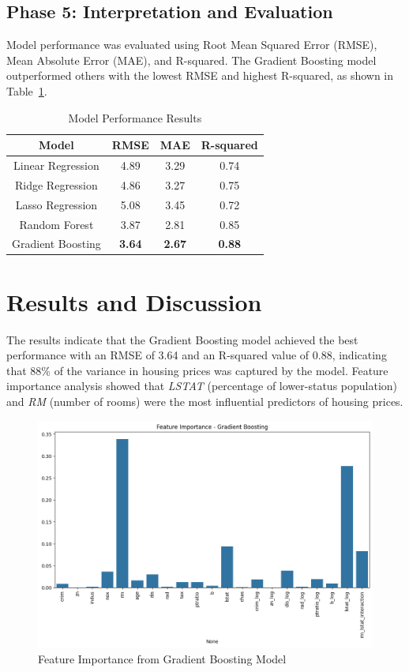 \documentclass[12pt]{article}
\begin{document}
\subsection{Phase 5: Interpretation and Evaluation}
Model performance was evaluated using Root Mean Squared Error (RMSE), Mean Absolute Error (MAE), and R-squared. The Gradient Boosting model outperformed others with the lowest RMSE and highest R-squared, as shown in Table~\ref{table:results}.

\begin{table}[H]
\centering
\begin{tabular}{|c|c|c|c|}
\hline
\textbf{Model}        & \textbf{RMSE}  & \textbf{MAE}   & \textbf{R-squared} \\ \hline
Linear Regression     & 4.89           & 3.29           & 0.74               \\ \hline
Ridge Regression      & 4.86           & 3.27           & 0.75               \\ \hline
Lasso Regression      & 5.08           & 3.45           & 0.72               \\ \hline
Random Forest         & 3.87           & 2.81           & 0.85               \\ \hline
Gradient Boosting     & \textbf{3.64}  & \textbf{2.67}  & \textbf{0.88}      \\ \hline
\end{tabular}
\caption{Model Performance Results}
\label{table:results}
\end{table}

\section{Results and Discussion}
The results indicate that the Gradient Boosting model achieved the best performance with an RMSE of 3.64 and an R-squared value of 0.88, indicating that 88\% of the variance in housing prices was captured by the model. Feature importance analysis showed that \textit{LSTAT} (percentage of lower-status population) and \textit{RM} (number of rooms) were the most influential predictors of housing prices.

\begin{figure}[H]
\centering
\includegraphics[width=0.7\linewidth]{feature_importance.png}
\caption{Feature Importance from Gradient Boosting Model}
\label{fig:feature_importance}
\end{figure}
\end{document}
